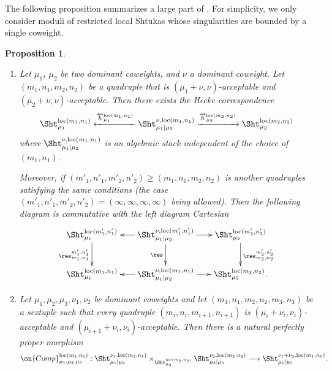 \documentclass[11pt]{amsart}
\newtheorem{proposition}[thm]{Proposition}
\theoremstyle{definition}
\theoremstyle{definition}
\theoremstyle{definition}
\numberwithin{equation}{subsection}
\newcommand{\loc}{\mathrm{loc}}
\newcommand{\longto}{\longrightarrow}
\begin{document}
The following proposition summarizes a large part of \cite[\S 5.3]{XZ}.
For simplicity, we only consider moduli of restricted local Shtukas whose singularities are bounded by a single coweight.
\begin{proposition}
\label{P:pushforward is local} 
\begin{enumerate}
\item Let $\mu_1$, $\mu_2$ be two dominant coweights, and $\nu$ a dominant coweight.
Let $(m_1,n_1,m_2,n_2)$ be a quadruple that is $(\mu_1+\nu, \nu)$-acceptable and $(\mu_2+\nu,\nu)$-acceptable.
Then there exists the Hecke correspondence
\begin{equation}\label{deompf1}
\Sht_{\mu_1}^{\loc(m_1,n_1)}\xleftarrow{\overleftarrow{h}_{\mu_1}^{\loc(m_1,n_1)}} \Sht_{\mu_1\mid \mu_2}^{\nu,\loc(m_1,n_1)}\xrightarrow{\overrightarrow{h}_{\mu_2}^{\loc(m_2,n_2)}} \Sht_{\mu_2}^{\loc(m_{2},n_{2})}
\end{equation}
where $\Sht_{\mu_1|\mu_2}^{\nu,\loc(m_1,n_1)}$ is an algebraic stack independent of the choice of $(m_1,n_1)$.

Moreover, if $(m'_1,n'_1,m'_2,n'_2)\geq (m_1,n_1,m_2,n_2)$ is another quadruples satisfying the same conditions (the case $(m'_1,n'_1,m'_2,n'_2)=(\infty,\infty,\infty,\infty)$ being allowed).
Then the following diagram is commutative with the left diagram Cartesian
\begin{equation*}
\label{E:cycle construction diagram full}
\xymatrix@C=17pt{
\Sht_{\mu_1}^{\loc(m'_1,n'_1)}\ar_{\res^{m'_1,n'_1}_{m_1,n_1}}[d]
&\Sht_{\mu_1|\mu_2}^{\nu,\loc(m'_1,n'_1)}\ar_{\res}[d]\ar[l]\ar[r]& \Sht_{\mu_2}^{\loc(m'_2,n'_2)}\ar^{\res^{m'_2,n'_2}_{m_2,n_2}}[d]
\\
\Sht_{\mu_1}^{\loc(m_1,n_1)}&\Sht_{\mu_1|\mu_2}^{\nu,\loc(m_1,n_1)}\ar[l]\ar[r]& \Sht_{\mu_2}^{\loc(m_2,n_2)}.
}
\end{equation*}

\item Let $\mu_1,\mu_2,\mu_3,\nu_1,\nu_2$ be dominant coweights and let $(m_1,n_1,m_2,n_2,m_3,n_3)$ be a sextuple such that every quadruple $(m_i,n_i,m_{i+1},n_{i+1})$ is $(\mu_i+\nu_i,\nu_i)$-acceptable and $(\mu_{i+1}+\nu_i,\nu_i)$-acceptable. Then there is a natural perfectly proper morphism
\begin{equation*}
\label{E:composition restricted}
\on{Comp}_{\mu_1, \mu_2, \mu_3}^{\mathrm{loc}(m_1,n_1)}: \Sht_{\mu_1|\mu_2}^{\nu_1,\loc(m_1,n_1)} \times_{\Sht_{\mu_2}^{\loc(m_2,n_2)}} \Sht_{\mu_2|\mu_3}^{\nu_2,\loc(m_2,n_2)} \longto \Sht_{\mu_1|\mu_3}^{\nu_1+\nu_2,\loc (m_1,n_1)}.
\end{equation*}


\end{enumerate}
\end{proposition}
\end{document}
